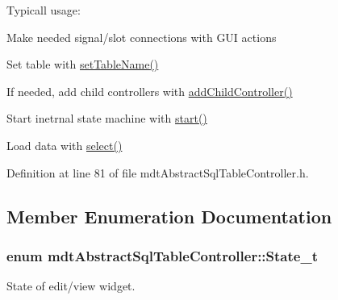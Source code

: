 Typicall usage\-:
\begin{DoxyItemize}
\item Make needed signal/slot connections with G\-U\-I actions
\item Set table with \hyperlink{classmdt_abstract_sql_table_controller_a5a94417dc46a7dc6de8b5ba0593494a7}{set\-Table\-Name()}
\item If needed, add child controllers with \hyperlink{classmdt_abstract_sql_table_controller_a448966fc2696cc2cef31f4663ccde662}{add\-Child\-Controller()}
\item Start inetrnal state machine with \hyperlink{classmdt_abstract_sql_table_controller_a06b594e9ebed9417ab15edcddaf0f05b}{start()}
\item Load data with \hyperlink{classmdt_abstract_sql_table_controller_ae26ede862ac54ece9243b264ea22cefb}{select()} 
\end{DoxyItemize}

Definition at line 81 of file mdt\-Abstract\-Sql\-Table\-Controller.\-h.



\subsection{Member Enumeration Documentation}
\hypertarget{classmdt_abstract_sql_table_controller_a63536182561f551ccb7616e1786793cd}{
\subsubsection[{State\-\_\-t}]{\setlength{\rightskip}{0pt plus 5cm}enum {\bf mdt\-Abstract\-Sql\-Table\-Controller\-::\-State\-\_\-t}}}\label{classmdt_abstract_sql_table_controller_a63536182561f551ccb7616e1786793cd}


State of edit/view widget. 

